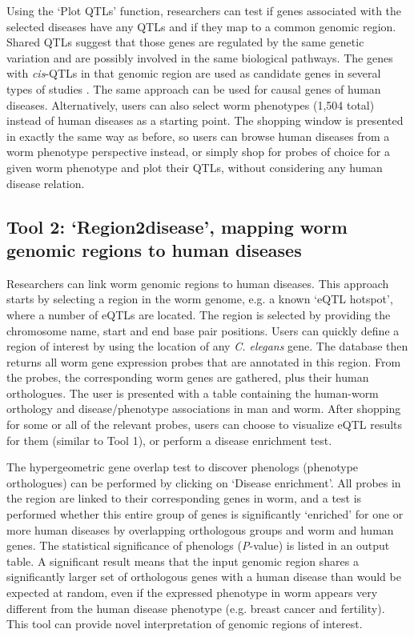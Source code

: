 Using the ‘Plot QTLs’ function, researchers can test if genes associated with the selected diseases have any QTLs and if they map to a common genomic region.
Shared QTLs suggest that those genes are regulated by the same genetic variation and are possibly involved in the same biological pathways.
The genes with \textsl{cis}-QTLs in that genomic region are used as candidate genes in several types of studies \cite{Keurentjes_2007,Terpstra_2010,Snoek_2013}.
The same approach can be used for causal genes of human diseases.
Alternatively, users can also select worm phenotypes (1,504 total) instead of human diseases as a starting point. The shopping window is presented in exactly the same way as before, so users can browse human diseases from a worm phenotype perspective instead, or simply shop for probes of choice for a given worm phenotype and plot their QTLs, without considering any human disease relation.

\subsection[Tool 2: ‘Region2disease’]{Tool 2: ‘Region2disease’, mapping worm genomic regions to human diseases}
Researchers can link worm genomic regions to human diseases. This approach starts by selecting a region in the worm genome, e.g. a known ‘eQTL hotspot’, where a number of eQTLs are located.
The region is selected by providing the chromosome name, start and end base pair positions.
Users can quickly define a region of interest by using the location of any \textsl{C. elegans} gene.
The database then returns all worm gene expression probes that are annotated in this region.
From the probes, the corresponding worm genes are gathered, plus their human orthologues. The user is presented with a table containing the human-worm orthology and disease/phenotype associations in man and worm.
After shopping for some or all of the relevant probes, users can choose to visualize eQTL results for them (similar to Tool 1), or perform a disease enrichment test.

The hypergeometric gene overlap test \cite{Rivals_2006} to discover phenologs (phenotype orthologues) can be performed by clicking on ‘Disease enrichment’.
All probes in the region are linked to their corresponding genes in worm, and a test is performed whether this entire group of genes is significantly ‘enriched’ for one or more human diseases by overlapping orthologous groups and worm and human genes. The statistical significance of phenologs (\textsl{P}-value) is listed in an output table.
A significant result means that the input genomic region shares a significantly larger set of orthologous genes with a human disease than would be expected at random, even if the expressed phenotype in worm appears very different from the human disease phenotype (e.g. breast cancer and fertility).
This tool can provide novel interpretation of genomic regions of interest.

